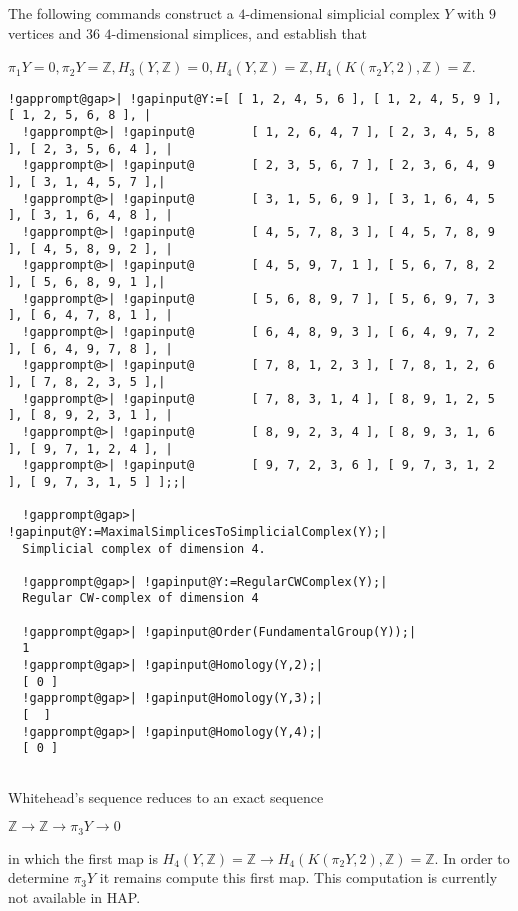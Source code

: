 \documentclass[a4paper,11pt]{report}
\begin{document}
{{{ The following commands construct a $4$-dimensional simplicial complex $Y$ with $9$ vertices and $36$ $4$-dimensional simplices, and establish that 

 $\pi_1Y=0 , \pi_2Y=\mathbb Z , H_3(Y,\mathbb Z)=0, H_4(Y,\mathbb Z)=\mathbb Z,
H_4(K(\pi_2Y,2), \mathbb Z) =\mathbb Z $. 
\begin{Verbatim}[commandchars=!@|,fontsize=\small,frame=single,label=Example]
  !gapprompt@gap>| !gapinput@Y:=[ [ 1, 2, 4, 5, 6 ], [ 1, 2, 4, 5, 9 ], [ 1, 2, 5, 6, 8 ], |
  !gapprompt@>| !gapinput@        [ 1, 2, 6, 4, 7 ], [ 2, 3, 4, 5, 8 ], [ 2, 3, 5, 6, 4 ], |
  !gapprompt@>| !gapinput@        [ 2, 3, 5, 6, 7 ], [ 2, 3, 6, 4, 9 ], [ 3, 1, 4, 5, 7 ],|
  !gapprompt@>| !gapinput@        [ 3, 1, 5, 6, 9 ], [ 3, 1, 6, 4, 5 ], [ 3, 1, 6, 4, 8 ], |
  !gapprompt@>| !gapinput@        [ 4, 5, 7, 8, 3 ], [ 4, 5, 7, 8, 9 ], [ 4, 5, 8, 9, 2 ], |
  !gapprompt@>| !gapinput@        [ 4, 5, 9, 7, 1 ], [ 5, 6, 7, 8, 2 ], [ 5, 6, 8, 9, 1 ],|
  !gapprompt@>| !gapinput@        [ 5, 6, 8, 9, 7 ], [ 5, 6, 9, 7, 3 ], [ 6, 4, 7, 8, 1 ], |
  !gapprompt@>| !gapinput@        [ 6, 4, 8, 9, 3 ], [ 6, 4, 9, 7, 2 ], [ 6, 4, 9, 7, 8 ], |
  !gapprompt@>| !gapinput@        [ 7, 8, 1, 2, 3 ], [ 7, 8, 1, 2, 6 ], [ 7, 8, 2, 3, 5 ],|
  !gapprompt@>| !gapinput@        [ 7, 8, 3, 1, 4 ], [ 8, 9, 1, 2, 5 ], [ 8, 9, 2, 3, 1 ], |
  !gapprompt@>| !gapinput@        [ 8, 9, 2, 3, 4 ], [ 8, 9, 3, 1, 6 ], [ 9, 7, 1, 2, 4 ], |
  !gapprompt@>| !gapinput@        [ 9, 7, 2, 3, 6 ], [ 9, 7, 3, 1, 2 ], [ 9, 7, 3, 1, 5 ] ];;|
  
  !gapprompt@gap>| !gapinput@Y:=MaximalSimplicesToSimplicialComplex(Y);|
  Simplicial complex of dimension 4.
  
  !gapprompt@gap>| !gapinput@Y:=RegularCWComplex(Y);|
  Regular CW-complex of dimension 4
  
  !gapprompt@gap>| !gapinput@Order(FundamentalGroup(Y));|
  1
  !gapprompt@gap>| !gapinput@Homology(Y,2);|
  [ 0 ]
  !gapprompt@gap>| !gapinput@Homology(Y,3);|
  [  ]
  !gapprompt@gap>| !gapinput@Homology(Y,4);|
  [ 0 ]
  
\end{Verbatim}
 

 Whitehead's sequence reduces to an exact sequence 

$\mathbb Z \rightarrow \mathbb Z \rightarrow \pi_3Y \rightarrow 0$ 

in which the first map is $ H_4(Y,\mathbb Z)=\mathbb Z \rightarrow H_4(K(\pi_2Y,2), \mathbb Z )=\mathbb Z $. In order to determine $\pi_3Y$ it remains compute this first map. This computation is currently not available
in HAP. 

}}}
\end{document}
